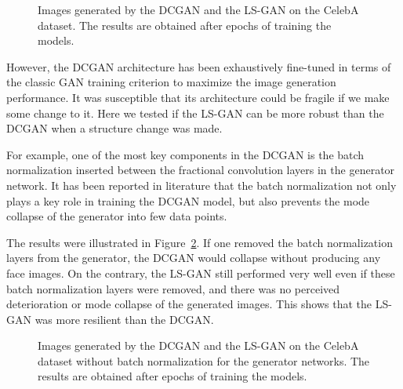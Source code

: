 \documentclass[11pt,fullpage, letterpaper,twoside]{article}
\newcommand{\1}[1]{\mathds{1}_{\left[#1\right]}}
\begin{document}
\begin{figure}[t!]
\centering
{}
\caption{Images generated by the DCGAN and the LS-GAN on the CelebA dataset. The results are obtained after  epochs of training the models.}\label{fig:celebA}
\end{figure}

However, the DCGAN architecture has been exhaustively fine-tuned in terms of the classic GAN training criterion to maximize the image generation performance. It was susceptible that its architecture could be fragile if we make some change to it. Here we tested if the LS-GAN can be more robust than the DCGAN when a structure change was made.

For example, one of the most key components in the DCGAN is the batch normalization inserted between the fractional convolution layers in the generator network. It has been reported in literature \cite{salimans2016improved} that the batch normalization not only plays a key role in training the DCGAN model, but also prevents the mode collapse of the generator into few data points.

The results were illustrated in Figure~\ref{fig:celebA_noBN}. If one removed the batch normalization layers from the generator, the DCGAN would collapse without producing any face images.  On the contrary, the LS-GAN still performed very well even if these batch normalization layers were removed, and there was { no perceived deterioration or mode collapse of the generated images}. This shows that the LS-GAN was more resilient than the DCGAN.

\begin{figure}[t]
\centering
{}
\caption{Images generated by the DCGAN and the LS-GAN on the CelebA dataset without batch normalization for the generator networks. The results are obtained after  epochs of training the models.}\label{fig:celebA_noBN}
\end{figure}
\end{document}
